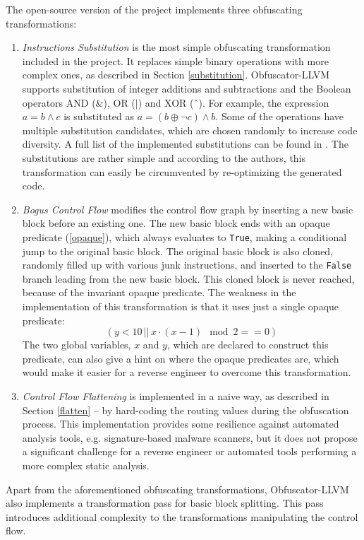 \documentclass[
  digital, %
  notable,   %
  twoside, %
  nolof,     %
  nolot,     %
]{fithesis3}
\theoremstyle{definition}
\begin{document}
The open-source version of the project implements three obfuscating transformations:
\begin{enumerate}
    \item \textit{Instructions Substitution} is the most simple obfuscating transformation included in the project. It replaces simple binary operations with more complex ones, as described in Section \ref{substitution}. Obfuscator-LLVM supports substitution of integer additions and subtractions and the Boolean operators  AND  ($\&$),  OR  ($|$)  and  XOR  (ˆ). For example, the expression $a = b \wedge c$ is substituted as $a = (b \oplus \neg c) \wedge b$. Some of the operations have multiple substitution candidates, which are chosen randomly to increase code diversity. A full list of the implemented substitutions can be found in \cite{obfuscator-llvm}. The substitutions are rather simple and according to the authors, this transformation  can easily  be  circumvented  by  re-optimizing  the  generated  code.
    \item \textit{Bogus Control Flow} modifies the control flow graph by inserting a new basic block before an existing one. The new basic block ends with an opaque predicate (\ref{opaque}), which always evaluates to \texttt{True}, making a conditional jump to the original basic block. The original basic block is also cloned, randomly filled up with various junk instructions, and inserted to the \texttt{False} branch leading from the new basic block. This cloned block is never reached, because of the invariant opaque predicate. The weakness in the implementation of this transformation is that it uses just a single opaque predicate: $$(y < 10\, ||\, x \cdot (x - 1) \mod 2 == 0)$$ The two global variables, $x$ and $y$, which are declared to construct this predicate, can also give a hint on where the opaque predicates are, which would make it easier for a reverse engineer to overcome this transformation. 
    \item \textit{Control Flow Flattening} is implemented in a naive way, as described in Section \ref{flatten} -- by hard-coding the routing values during the obfuscation process. This implementation provides some resilience against automated analysis tools, e.g. signature-based malware scanners, but it does not propose a significant challenge for a reverse engineer or automated tools performing a more complex static analysis.
\end{enumerate}

Apart from the aforementioned obfuscating transformations, Obfuscator-LLVM also implements a transformation pass for basic block splitting. This pass introduces additional complexity to the transformations manipulating the control flow. 
\end{document}
